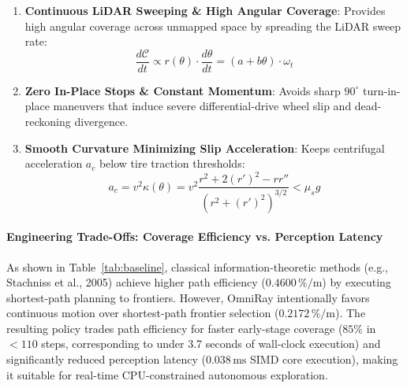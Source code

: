\documentclass[11pt,a4paper]{article}
\begin{document}
\begin{enumerate}
    \item \textbf{Continuous LiDAR Sweeping \& High Angular Coverage}: Provides high angular coverage across unmapped space by spreading the LiDAR sweep rate:
    \begin{equation}
        \frac{d\mathcal{C}}{dt} \propto r(\theta) \cdot \frac{d\theta}{dt} = (a + b\theta) \cdot \omega_t
    \end{equation}
    
    \item \textbf{Zero In-Place Stops \& Constant Momentum}: Avoids sharp $90^\circ$ turn-in-place maneuvers that induce severe differential-drive wheel slip and dead-reckoning divergence.
    
    \item \textbf{Smooth Curvature Minimizing Slip Acceleration}: Keeps centrifugal acceleration $a_c$ below tire traction thresholds:
    \begin{equation}
        a_c = v^2 \kappa(\theta) = v^2 \frac{r^2 + 2(r')^2 - r r''}{\left(r^2 + (r')^2\right)^{3/2}} < \mu_s g
    \end{equation}
\end{enumerate}

\paragraph{Engineering Trade-Offs: Coverage Efficiency vs. Perception Latency} As shown in Table~\ref{tab:baseline}, classical information-theoretic methods (e.g., Stachniss et al., 2005) achieve higher path efficiency ($0.4600\,\%/\text{m}$) by executing shortest-path planning to frontiers. However, OmniRay intentionally favors continuous motion over shortest-path frontier selection ($0.2172\,\%/\text{m}$). The resulting policy trades path efficiency for faster early-stage coverage ($85\%$ in $<110$ steps, corresponding to under 3.7 seconds of wall-clock execution) and significantly reduced perception latency ($0.038\,\text{ms}$ SIMD core execution), making it suitable for real-time CPU-constrained autonomous exploration.
\end{document}
